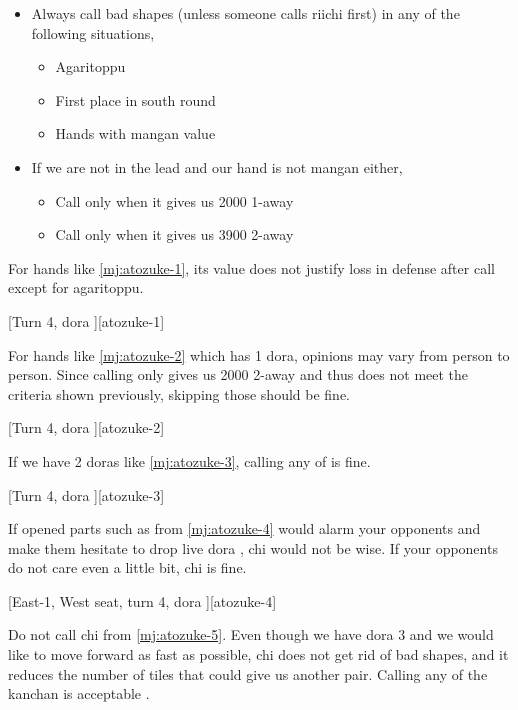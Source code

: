 \documentclass[12pt]{article}
\begin{document}
\begin{itemize}
  \item Always call bad shapes (unless someone calls riichi first) in any of the following situations,
  \begin{itemize}
    \item Agaritoppu
    \item First place in south round
    \item Hands with mangan value
  \end{itemize}
  \item If we are not in the lead and our hand is not mangan either,
  \begin{itemize}
    \item Call only when it gives us 2000 1-away
    \item Call only when it gives us 3900 2-away
  \end{itemize}
\end{itemize}

For hands like \ref{mj:atozuke-1}, its value does not justify loss in defense after  call except for agaritoppu.

[Turn 4, dora ][atozuke-1]

For hands like \ref{mj:atozuke-2} which has 1 dora, opinions may vary from person to person. Since calling  only gives us 2000 2-away and thus does not meet the criteria shown previously, skipping those should be fine.

[Turn 4, dora ][atozuke-2]

If we have 2 doras like \ref{mj:atozuke-3}, calling any of  is fine.

[Turn 4, dora ][atozuke-3]

If opened parts such as  from \ref{mj:atozuke-4} would alarm your opponents and make them hesitate to drop live dora ,  chi would not be wise. If your opponents do not care even a little bit,  chi is fine.

[East-1, West seat, turn 4, dora ][atozuke-4]

Do not call  chi from \ref{mj:atozuke-5}. Even though we have dora 3 and we would like to move forward as fast as possible,  chi does not get rid of bad shapes, and it reduces the number of tiles that could give us another pair. Calling any of the kanchan is acceptable \citep[][pp.~116--117]{fkt}.
\end{document}
